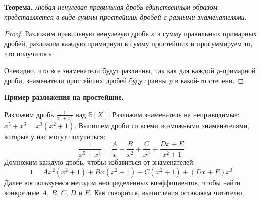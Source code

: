 \textbf{Теорема.}
\textit{Любая ненулевая правильная дробь единственным образом представляется в виде суммы простейших дробей с разными знаменателями.}

\begin{proof}
    Разложим правильную ненулевую дробь $s$ в сумму правильных примарных дробей, разложим каждую примарную в сумму простейших и просуммируем то, что получилось.

    Очевидно, что все знаменатели будут различны, так как для каждой $p$-примарной дроби, знаменатели простейших дробей будут равны $p$ в какой-то степени.
\end{proof}

\vspace{7mm}

\textbf{Пример разложения на простейшие.}

Разложим дробь $\frac{1}{x^5 + x^3}$ над $\mathbb{R}[X]$. 
Разложим знаменатель на неприводимые: $x^5 + x^3 = x^3(x^2 + 1)$.
Выпишем дроби со всеми возможными знаменателями, которые у нас могут получиться:
\[ \frac{1}{x^5 + x^3} = \frac{A}{x} + \frac{B}{x^2} + \frac{C}{x^3} + \frac{Dx + E}{x^2 + 1} \]
Домножим каждую дробь, чтобы избавиться от знаменателей:
\[ 1 = Ax^2(x^2 + 1) + Bx(x^2 + 1) + C(x^2 + 1) + (Dx + E)x^3 \]
Далее воспользуемся методом неопределенных коэффициентов, чтобы найти конкретные $A, \, B, \, C, \, D$ и $E$.
Как говорится, вычисления оставляем читателю.